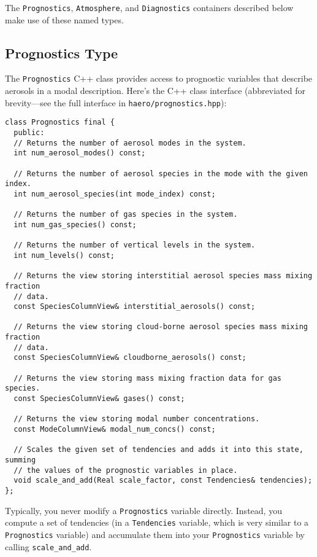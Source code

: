 The \texttt{Prognostics}, \texttt{Atmosphere}, and \texttt{Diagnostics} containers
described below make use of these named types.

\subsection{Prognostics Type}

The \texttt{Prognostics} C++ class provides access to prognostic variables
that describe aerosols in a modal description. Here's the C++ class interface
(abbreviated for brevity---see the full interface in \texttt{haero/prognostics.hpp}):

\begin{lstlisting}
class Prognostics final {
  public:
  // Returns the number of aerosol modes in the system.
  int num_aerosol_modes() const;

  // Returns the number of aerosol species in the mode with the given index.
  int num_aerosol_species(int mode_index) const;

  // Returns the number of gas species in the system.
  int num_gas_species() const;

  // Returns the number of vertical levels in the system.
  int num_levels() const;

  // Returns the view storing interstitial aerosol species mass mixing fraction
  // data.
  const SpeciesColumnView& interstitial_aerosols() const;

  // Returns the view storing cloud-borne aerosol species mass mixing fraction
  // data.
  const SpeciesColumnView& cloudborne_aerosols() const;

  // Returns the view storing mass mixing fraction data for gas species.
  const SpeciesColumnView& gases() const;

  // Returns the view storing modal number concentrations.
  const ModeColumnView& modal_num_concs() const;

  // Scales the given set of tendencies and adds it into this state, summing
  // the values of the prognostic variables in place.
  void scale_and_add(Real scale_factor, const Tendencies& tendencies);
};
\end{lstlisting}

Typically, you never modify a \texttt{Prognostics} variable directly. Instead, you
compute a set of tendencies (in a \texttt{Tendencies} variable, which is very
similar to a \texttt{Prognostics} variable) and accumulate them into your
\texttt{Prognostics} variable by calling \texttt{scale\_and\_add}.

